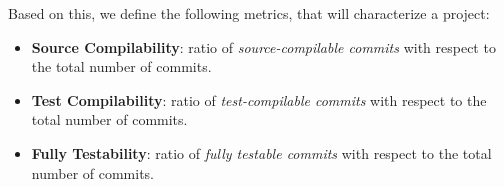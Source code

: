 Based on this, we define the following metrics, that will characterize a project:
\begin{itemize}
    \item \textbf{Source Compilability}: ratio of \textit{source-compilable commits} with respect to the total number of commits.
    \item \textbf{Test Compilability}: ratio of \textit{test-compilable commits} with respect to the total number of commits.
    \item \textbf{Fully Testability}: ratio of \textit{fully testable commits} with respect to the total number of commits.
\end{itemize}


